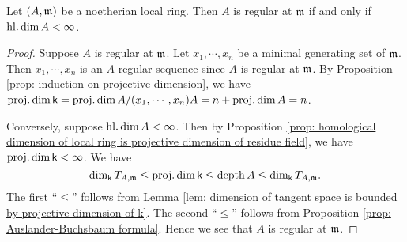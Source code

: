 
    \begin{theorem}\label{thm: regularity and finite homological dimension}
        Let \((A,{\mathfrak{m}})\) be a noetherian local ring.
        Then \(A\) is regular at \({\mathfrak{m}}\) if and only if \(\operatorname{hl.dim} A < \infty\).
    \end{theorem}
    \begin{proof}
        Suppose \(A\) is regular at \({\mathfrak{m}}\).
        Let \(x_1,\cdots,x_n\) be a minimal generating set of \({\mathfrak{m}}\).
        Then \(x_1,\cdots,x_n\) is an \(A\)-regular sequence since \(A\) is regular at \({\mathfrak{m}}\).
        By Proposition \ref{prop: induction on projective dimension}, we have 
        \( \operatorname{proj.dim} {\mathsf{k}} = \operatorname{proj.dim} A/(x_1,\cdots,x_n)A = n + \operatorname{proj.dim} A = n\).

        Conversely, suppose \(\operatorname{hl.dim} A < \infty\).
        Then by Proposition \ref{prop: homological dimension of local ring is projective dimension of residue field}, we have \(\operatorname{proj.dim} {\mathsf{k}} < \infty\).
        We have 
        \[ \dim_{\mathsf{k}} T_{A,{\mathfrak{m}}} \leq \operatorname{proj.dim} {\mathsf{k}} \leq \operatorname{depth} A \leq \dim_{\mathsf{k}} T_{A,{\mathfrak{m}}}. \]
        The first ``\(\leq\)'' follows from Lemma \ref{lem: dimension of tangent space is bounded by projective dimension of k}.
        The second ``\(\leq\)'' follows from Proposition \ref{prop: Auslander-Buchsbaum formula}.
        Hence we see that \(A\) is regular at \({\mathfrak{m}}\).
    \end{proof}

